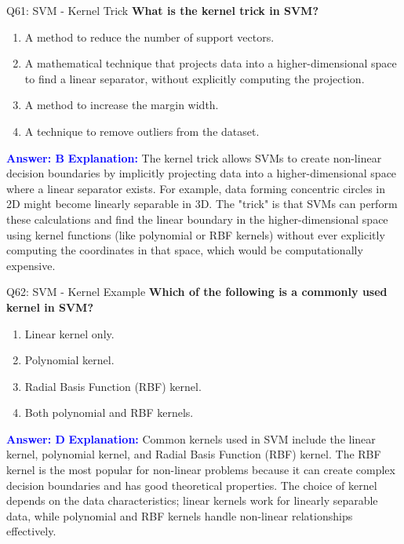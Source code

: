 \documentclass[8pt]{beamer}
\begin{document}
	\begin{frame}{Q61: SVM - Kernel Trick}
		\fontsize{6.5}{7.5}\selectfont
		\textbf{What is the kernel trick in SVM?}
		\begin{enumerate}
			\item A method to reduce the number of support vectors.
			\item A mathematical technique that projects data into a higher-dimensional space to find a linear separator, without explicitly computing the projection.
			\item A method to increase the margin width.
			\item A technique to remove outliers from the dataset.
		\end{enumerate}
		\vspace{0.1cm}
		\textcolor{blue}{\textbf{Answer: B}}
		\vspace{0.1cm}
		\textcolor{blue}{\textbf{Explanation:}} The kernel trick allows SVMs to create non-linear decision boundaries by implicitly projecting data into a higher-dimensional space where a linear separator exists. For example, data forming concentric circles in 2D might become linearly separable in 3D. The "trick" is that SVMs can perform these calculations and find the linear boundary in the higher-dimensional space using kernel functions (like polynomial or RBF kernels) without ever explicitly computing the coordinates in that space, which would be computationally expensive.
	\end{frame}
	
	\begin{frame}{Q62: SVM - Kernel Example}
		\fontsize{6.5}{7.5}\selectfont
		\textbf{Which of the following is a commonly used kernel in SVM?}
		\begin{enumerate}
			\item Linear kernel only.
			\item Polynomial kernel.
			\item Radial Basis Function (RBF) kernel.
			\item Both polynomial and RBF kernels.
		\end{enumerate}
		\vspace{0.1cm}
		\textcolor{blue}{\textbf{Answer: D}}
		\vspace{0.1cm}
		\textcolor{blue}{\textbf{Explanation:}} Common kernels used in SVM include the linear kernel, polynomial kernel, and Radial Basis Function (RBF) kernel. The RBF kernel is the most popular for non-linear problems because it can create complex decision boundaries and has good theoretical properties. The choice of kernel depends on the data characteristics; linear kernels work for linearly separable data, while polynomial and RBF kernels handle non-linear relationships effectively.
	\end{frame}
	
\end{document}
